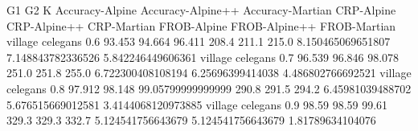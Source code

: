 G1 G2 K Accuracy-Alpine Accuracy-Alpine++ Accuracy-Martian CRP-Alpine CRP-Alpine++ CRP-Martian FROB-Alpine FROB-Alpine++ FROB-Martian
village celegans 0.6 93.453 94.664 96.411 208.4 211.1 215.0 8.150465069651807 7.148843782336526 5.842246449606361
village celegans 0.7 96.539 96.846 98.078 251.0 251.8 255.0 6.722300408108194 6.25696399414038 4.486802766692521
village celegans 0.8 97.912 98.148 99.05799999999999 290.8 291.5 294.2 6.45981039488702 5.676515669012581 3.4144068120973885
village celegans 0.9 98.59 98.59 99.61 329.3 329.3 332.7 5.124541756643679 5.124541756643679 1.81789634104076
